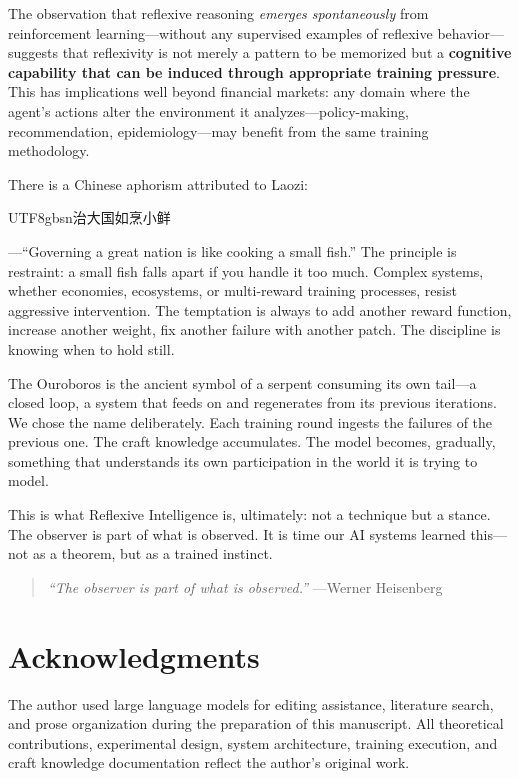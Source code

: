 \documentclass[11pt,a4paper]{article}
\begin{document}
The observation that reflexive reasoning \textit{emerges spontaneously} from reinforcement learning---without any supervised examples of reflexive behavior---suggests that reflexivity is not merely a pattern to be memorized but a \textbf{cognitive capability that can be induced through appropriate training pressure}. This has implications well beyond financial markets: any domain where the agent's actions alter the environment it analyzes---policy-making, recommendation, epidemiology---may benefit from the same training methodology.

There is a Chinese aphorism attributed to Laozi: \begin{CJK}{UTF8}{gbsn}治大国如烹小鲜\end{CJK}---``Governing a great nation is like cooking a small fish.'' The principle is restraint: a small fish falls apart if you handle it too much. Complex systems, whether economies, ecosystems, or multi-reward training processes, resist aggressive intervention. The temptation is always to add another reward function, increase another weight, fix another failure with another patch. The discipline is knowing when to hold still.

The Ouroboros is the ancient symbol of a serpent consuming its own tail---a closed loop, a system that feeds on and regenerates from its previous iterations. We chose the name deliberately. Each training round ingests the failures of the previous one. The craft knowledge accumulates. The model becomes, gradually, something that understands its own participation in the world it is trying to model.

This is what Reflexive Intelligence is, ultimately: not a technique but a stance. The observer is part of what is observed. It is time our AI systems learned this---not as a theorem, but as a trained instinct.

\begin{quote}
\textit{``The observer is part of what is observed.''} ---Werner Heisenberg
\end{quote}

\section*{Acknowledgments}

The author used large language models for editing assistance, literature search, and prose organization during the preparation of this manuscript. All theoretical contributions, experimental design, system architecture, training execution, and craft knowledge documentation reflect the author's original work.
\end{document}
